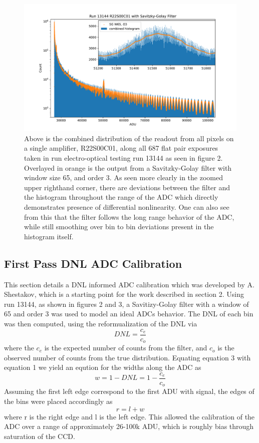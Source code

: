 \documentclass[11pt, letterpaper]{article}
\begin{document}
\begin{figure}
    \centering
    \includegraphics[width=0.5\linewidth]{bar2.pdf}
    \caption{Above is the combined distribution of the readout from all pixels on a single amplifier, R22S00C01, along all 687 flat pair exposures taken in run electro-optical testing run 13144 as seen in figure 2. Overlayed in orange is the output from a Savitzky-Golay filter with window size 65, and order 3. As seen more clearly in the zoomed upper righthand corner, there are deviations between the filter and the histogram throughout the range of the ADC which directly demonstrates presence of differential nonlinearity. One can also see from this that the filter follows the long range behavior of the ADC, while still smoothing over bin to bin deviations present in the histogram itself.}
    \label{fig:enter-label}
\end{figure}

\subsection{First Pass DNL ADC Calibration}
\indent


This section details a DNL informed ADC calibration which was developed by A. Shestakov, which is a starting point for the work described in section 2. 
Using run 13144, as shown in figures 2 and 3, a Savitizy-Golay filter with a window of 65 and order 3 was used to model an ideal ADCs behavior. 
The DNL of each bin was then computed, using the reformualization of the DNL via 
 \begin{equation}\label{}
 DNL = \frac{c_e}{c_o}
 \end{equation}
where the $c_{e}$ is the expected number of counts from the filter, and $c_{o}$ is the observed number of counts from the true distribution. 
Equating equation 3 with equation 1 we yield an eqution for the widths along the ADC as
 \begin{equation}\label{}
 w = 1-DNL = 1- \frac{c_e}{c_o}
 \end{equation}
Assuming the first left edge correspond to the first ADU with signal, the edges of the bins were placed accordingly as
 \begin{equation}\label{}
r = l + w 
\end{equation}
where r is the right edge and l is the left edge. 
This allowed the calibration of the ADC over a range of approximately 26-100k ADU, which is roughly bias through saturation of the CCD.  
\end{document}
